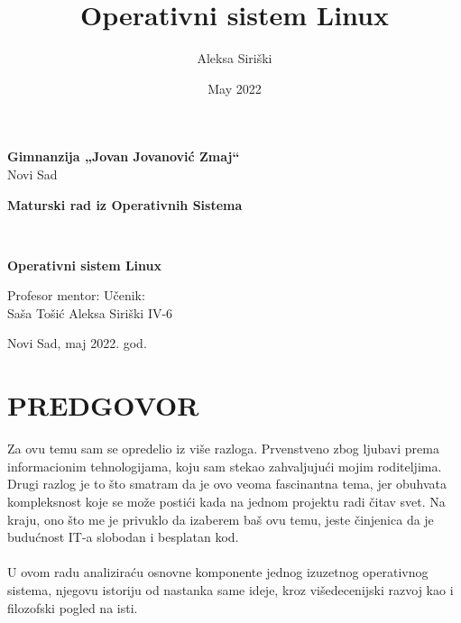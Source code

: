 \documentclass[a4paper,14pt]{article}
\title{Operativni sistem Linux}
\author{Aleksa Siriški}
\date{May 2022}
\begin{document}
\pagestyle{empty}
\begin{center}
\textbf{Gimnanzija „Jovan Jovanović Zmaj“}
\\
Novi Sad
\end{center}
\vfill
\begin{center}
	\begin{large}
		\textbf{Maturski rad iz Operativnih Sistema}
		\bigskip 
	\end{large}
	\\
	\begin{huge}
        \textbf{Operativni sistem Linux}
	\end{huge}
\end{center}
\vfill
\begin{normalsize}
Profesor mentor:
\hfill
Učenik:
\\
Saša Tošić
\hfill
Aleksa Siriški IV-6
\end{normalsize}
\vfill
\begin{center}
Novi Sad, maj 2022. god.
\end{center}
\newpage

\pagestyle{plain}
\section*{PREDGOVOR}
Za ovu temu sam se opredelio iz više razloga. Prvenstveno zbog ljubavi prema informacionim tehnologijama, koju sam stekao zahvaljujući mojim roditeljima. Drugi razlog je to što smatram da je ovo veoma fascinantna tema, jer obuhvata kompleksnost koje se može postići kada na jednom projektu radi čitav svet. Na kraju, ono što me je privuklo da izaberem baš ovu temu, jeste činjenica da je budućnost IT-a slobodan i besplatan kod.
\\\\
U ovom radu analiziraću osnovne komponente jednog izuzetnog operativnog sistema, njegovu istoriju od nastanka same ideje, kroz višedecenijski razvoj kao i filozofski pogled na isti.
\newpage

\renewcommand{\contentsname}{SADRŽAJ}
\tableofcontents
\newpage

\pagestyle{fancy}
\fancyhf{}
\cfoot{\thepage}
\end{document}
